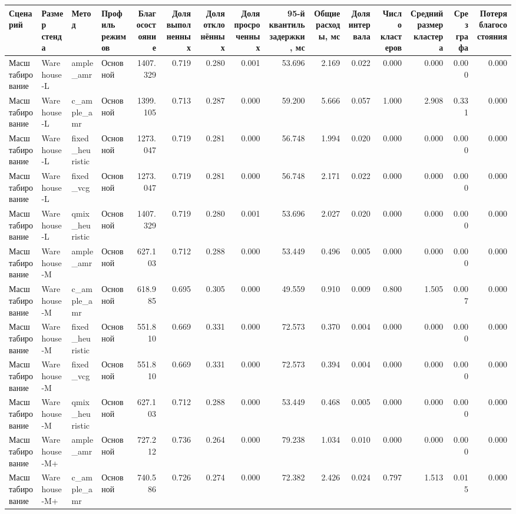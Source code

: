 \begin{tabular}{llllrrrrrrrrrrr}
\toprule
 Сценарий & Размер стенда & Метод & Профиль режимов & Благосостояние & Доля выполненных & Доля отклонённых & Доля просроченных & 95-й квантиль задержки, мс & Общие расходы, мс & Доля интервала & Число кластеров & Средний размер кластера & Срез графа & Потеря благосостояния \\
\midrule
 Масштабирование & Warehouse-L & ample_amr & Основной & 1407.329 & 0.719 & 0.280 & 0.001 & 53.696 & 2.169 & 0.022 & 0.000 & 0.000 & 0.000 & 0.000 \\
 Масштабирование & Warehouse-L & c_ample_amr & Основной & 1399.105 & 0.713 & 0.287 & 0.000 & 59.200 & 5.666 & 0.057 & 1.000 & 2.908 & 0.331 & 0.000 \\
 Масштабирование & Warehouse-L & fixed_heuristic & Основной & 1273.047 & 0.719 & 0.281 & 0.000 & 56.748 & 1.994 & 0.020 & 0.000 & 0.000 & 0.000 & 0.000 \\
 Масштабирование & Warehouse-L & fixed_vcg & Основной & 1273.047 & 0.719 & 0.281 & 0.000 & 56.748 & 2.171 & 0.022 & 0.000 & 0.000 & 0.000 & 0.000 \\
 Масштабирование & Warehouse-L & qmix_heuristic & Основной & 1407.329 & 0.719 & 0.280 & 0.001 & 53.696 & 2.027 & 0.020 & 0.000 & 0.000 & 0.000 & 0.000 \\
 Масштабирование & Warehouse-M & ample_amr & Основной & 627.103 & 0.712 & 0.288 & 0.000 & 53.449 & 0.496 & 0.005 & 0.000 & 0.000 & 0.000 & 0.000 \\
 Масштабирование & Warehouse-M & c_ample_amr & Основной & 618.985 & 0.695 & 0.305 & 0.000 & 49.559 & 0.910 & 0.009 & 0.800 & 1.505 & 0.007 & 0.000 \\
 Масштабирование & Warehouse-M & fixed_heuristic & Основной & 551.810 & 0.669 & 0.331 & 0.000 & 72.573 & 0.370 & 0.004 & 0.000 & 0.000 & 0.000 & 0.000 \\
 Масштабирование & Warehouse-M & fixed_vcg & Основной & 551.810 & 0.669 & 0.331 & 0.000 & 72.573 & 0.394 & 0.004 & 0.000 & 0.000 & 0.000 & 0.000 \\
 Масштабирование & Warehouse-M & qmix_heuristic & Основной & 627.103 & 0.712 & 0.288 & 0.000 & 53.449 & 0.468 & 0.005 & 0.000 & 0.000 & 0.000 & 0.000 \\
 Масштабирование & Warehouse-M+ & ample_amr & Основной & 727.212 & 0.736 & 0.264 & 0.000 & 79.238 & 1.034 & 0.010 & 0.000 & 0.000 & 0.000 & 0.000 \\
 Масштабирование & Warehouse-M+ & c_ample_amr & Основной & 740.586 & 0.726 & 0.274 & 0.000 & 72.382 & 2.426 & 0.024 & 0.797 & 1.513 & 0.015 & 0.000 \\

\end{tabular}
